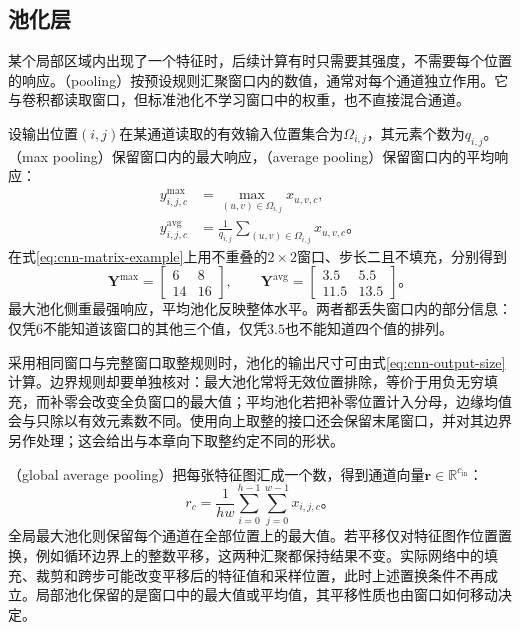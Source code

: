 \subsection{池化层}
\label{sec:cnn-pooling}

某个局部区域内出现了一个特征时，后续计算有时只需要其强度，不需要每个位置的响应。（pooling）按预设规则汇聚窗口内的数值，通常对每个通道独立作用。它与卷积都读取窗口，但标准池化不学习窗口中的权重，也不直接混合通道。

设输出位置$(i,j)$在某通道读取的有效输入位置集合为$\Omega_{i,j}$，其元素个数为$q_{i,j}$。（max pooling）保留窗口内的最大响应，（average pooling）保留窗口内的平均响应：
\begin{equation}
  \begin{aligned}
    y_{i,j,c}^{\mathrm{max}}&=\max_{(u,v)\in\Omega_{i,j}}x_{u,v,c},\\
    y_{i,j,c}^{\mathrm{avg}}&=\frac1{q_{i,j}}
                   \sum_{(u,v)\in\Omega_{i,j}}x_{u,v,c}\text{。}
  \end{aligned}
  \label{eq:cnn-local-pooling}
\end{equation}
在式\eqref{eq:cnn-matrix-example}上用不重叠的$2\times2$窗口、步长二且不填充，分别得到
\begin{equation}
  \bm Y^{\mathrm{max}}=\begin{bmatrix}6&8\\14&16\end{bmatrix},\qquad
  \bm Y^{\mathrm{avg}}=\begin{bmatrix}3.5&5.5\\11.5&13.5\end{bmatrix}\text{。}
  \label{eq:cnn-pooling-example}
\end{equation}
最大池化侧重最强响应，平均池化反映整体水平。两者都丢失窗口内的部分信息：仅凭$6$不能知道该窗口的其他三个值，仅凭$3.5$也不能知道四个值的排列。

采用相同窗口与完整窗口取整规则时，池化的输出尺寸可由式\eqref{eq:cnn-output-size}计算。边界规则却要单独核对：最大池化常将无效位置排除，等价于用负无穷填充，而补零会改变全负窗口的最大值；平均池化若把补零位置计入分母，边缘均值会与只除以有效元素数不同。使用向上取整的接口还会保留末尾窗口，并对其边界另作处理；这会给出与本章向下取整约定不同的形状。

（global average pooling）把每张特征图汇成一个数，得到通道向量$\bm r\in\mathbb R^{c_{\mathrm{in}}}$：
\begin{equation}
  r_c=\frac1{hw}\sum_{i=0}^{h-1}\sum_{j=0}^{w-1}x_{i,j,c}\text{。}
  \label{eq:cnn-global-average-pooling}
\end{equation}
全局最大池化则保留每个通道在全部位置上的最大值。若平移仅对特征图作位置置换，例如循环边界上的整数平移，这两种汇聚都保持结果不变。实际网络中的填充、裁剪和跨步可能改变平移后的特征值和采样位置，此时上述置换条件不再成立。局部池化保留的是窗口中的最大值或平均值，其平移性质也由窗口如何移动决定。


